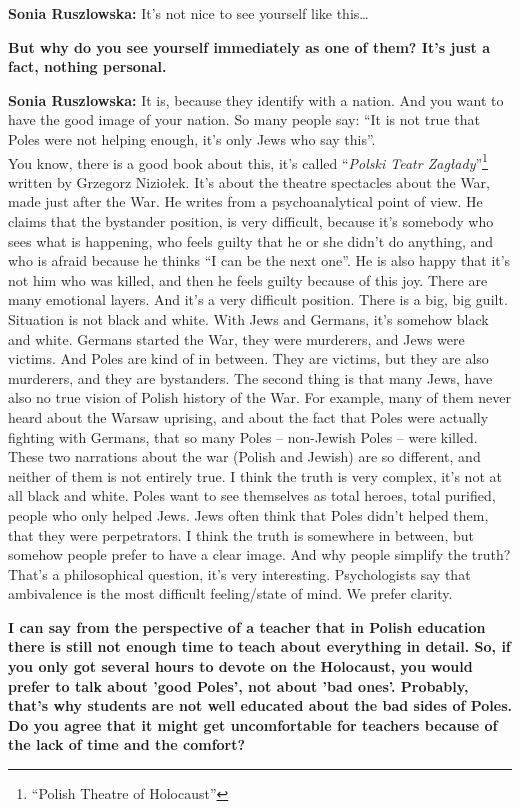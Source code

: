 \textbf{Sonia Ruszlowska:} It’s not nice to see yourself like this… 

\textbf{But why do you see yourself immediately as one of them? It’s just a fact, nothing personal.} 

\textbf{Sonia Ruszlowska:} It is, because they identify with a nation. And you want to have the good image of your nation. So many people say: ``It is not true that Poles were not helping enough, it’s only Jews who say this''.\\
You know, there is a good book about this, it’s called ``\textit{Polski Teatr Zagłady}''\footnote{``Polish Theatre of Holocaust''} written by Grzegorz Niziołek. It’s about the theatre spectacles about the War, made just after the War. He writes from a psychoanalytical point of view. He claims that the bystander position, is very difficult, because it’s somebody who sees what is happening, who feels guilty that he or she didn’t do anything, and who is afraid because he thinks ``I can be the next one''. He is also happy that it’s not him who was killed, and then he feels guilty because of this joy. There are many emotional layers. And it’s a very difficult position. There is a big, big guilt. Situation is not black and white. With Jews and Germans, it’s somehow black and white. Germans started the War, they were murderers, and Jews were victims. And Poles are kind of in between. They are victims, but they are also murderers, and they are bystanders. The second thing is that many Jews, have also no true vision of Polish history of the War. For example, many of them never heard about the Warsaw uprising, and about the fact that Poles were actually fighting with Germans, that so many Poles – non-Jewish Poles – were killed. These two narrations about the war (Polish and Jewish) are so different, and neither of them is not entirely true. I think the truth is very complex, it’s not at all black and white. Poles want to see themselves as total heroes, total purified, people who only helped Jews. Jews often think that Poles didn’t helped them, that they were perpetrators. I think the truth is somewhere in between, but somehow people prefer to have a clear image. And why people simplify the truth? That’s a philosophical question, it’s very interesting. Psychologists say that ambivalence is the most difficult feeling/state of mind. We prefer clarity. 

\textbf{I can say from the perspective of a teacher that in Polish education there is still not enough time to teach about everything in detail. So, if you only got several hours to devote on the Holocaust, you would prefer to talk about 'good Poles', not about 'bad ones'. Probably, that’s why students are not well educated about the bad sides of Poles. Do you agree that it might get uncomfortable for teachers because of the lack of time and the comfort?} 

